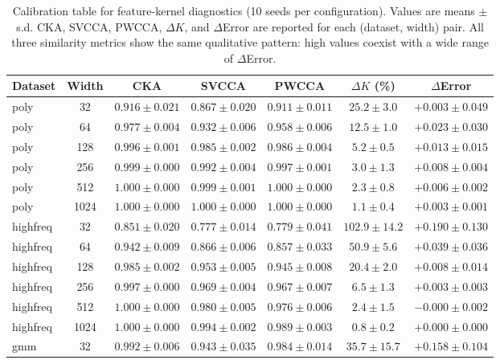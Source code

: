 \documentclass[10pt]{article}
\begin{document}
\begin{table}[t]
    \centering\footnotesize
    \setlength{\tabcolsep}{4pt}
    \caption{Calibration table for feature-kernel diagnostics (10 seeds per configuration).  Values are means $\pm$ s.d.  CKA, SVCCA, PWCCA, $\Delta K$, and $\Delta$Error are reported for each (dataset, width) pair.  All three similarity metrics show the same qualitative pattern: high values coexist with a wide range of $\Delta$Error.}
    \label{tab:results}
    \begin{tabular}{lcccccc}
    \toprule
    Dataset & Width & CKA & SVCCA & PWCCA & $\Delta K$ (\%) & $\Delta$Error \\
    \midrule
    poly & 32   & $0.916\pm0.021$ & $0.867\pm0.020$ & $0.911\pm0.011$ & $25.2\pm3.0$ & $+0.003\pm0.049$ \\
    poly & 64   & $0.977\pm0.004$ & $0.932\pm0.006$ & $0.958\pm0.006$ & $12.5\pm1.0$ & $+0.023\pm0.030$ \\
    poly & 128  & $0.996\pm0.001$ & $0.985\pm0.002$ & $0.986\pm0.004$ & $5.2\pm0.5$  & $+0.013\pm0.015$ \\
    poly & 256  & $0.999\pm0.000$ & $0.992\pm0.004$ & $0.997\pm0.001$ & $3.0\pm1.3$  & $+0.008\pm0.004$ \\
    poly & 512  & $1.000\pm0.000$ & $0.999\pm0.001$ & $1.000\pm0.000$ & $2.3\pm0.8$  & $+0.006\pm0.002$ \\
    poly & 1024 & $1.000\pm0.000$ & $1.000\pm0.000$ & $1.000\pm0.000$ & $1.1\pm0.4$  & $+0.003\pm0.001$ \\
    \midrule
    highfreq & 32  & $0.851\pm0.020$ & $0.777\pm0.014$ & $0.779\pm0.041$ & $102.9\pm14.2$ & $+0.190\pm0.130$ \\
    highfreq & 64  & $0.942\pm0.009$ & $0.866\pm0.006$ & $0.857\pm0.033$ & $50.9\pm5.6$   & $+0.039\pm0.036$ \\
    highfreq & 128 & $0.985\pm0.002$ & $0.953\pm0.005$ & $0.945\pm0.008$ & $20.4\pm2.0$   & $+0.008\pm0.014$ \\
    highfreq & 256 & $0.997\pm0.000$ & $0.969\pm0.004$ & $0.967\pm0.007$ & $6.5\pm1.3$    & $+0.003\pm0.003$ \\
    highfreq & 512 & $1.000\pm0.000$ & $0.980\pm0.005$ & $0.976\pm0.006$ & $2.4\pm1.5$    & $-0.000\pm0.002$ \\
    highfreq & 1024 & $1.000\pm0.000$ & $0.994\pm0.002$ & $0.989\pm0.003$ & $0.8\pm0.2$    & $+0.000\pm0.000$ \\
    \midrule
    gmm & 32  & $0.992\pm0.006$ & $0.943\pm0.035$ & $0.984\pm0.014$ & $35.7\pm15.7$ & $+0.158\pm0.104$ \\

\end{tabular}
\end{table}
\end{document}

